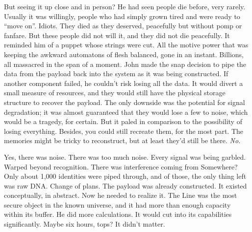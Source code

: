 But seeing it up close and in person? He had seen people die before, very rarely. Usually it was willingly, people who had simply grown tired and were ready to “move on”. Idiots. They died as they deserved, peacefully but without pomp or fanfare. But these people did not will it, and they did not die peacefully. It reminded him of a puppet whose strings were cut. All the motive power that was keeping the awkward automatons of flesh balanced, gone in an instant. Billions, all massacred in the span of a moment.
\SmallVSpace
John made the snap decision to pipe the data from the payload back into the system as it was being constructed. If another component failed, he couldn’t risk losing all the data. It would divert a small measure of resources, and they would still have the physical storage structure to recover the payload.  The only downside was the potential for signal degradation; it was almost guaranteed that they would lose a few to noise, which would be a tragedy, for certain. But it paled in comparison to the possibility of losing everything. Besides, you could still recreate them, for the most part. The memories might be tricky to reconstruct, but at least they’d still be there.
\SmallVSpace
\emph{No.}\par
\SmallVSpace
Yes, there was noise. There was too much noise. Every signal was being garbled. Warped beyond recognition. There was interference coming from{\el} Somewhere? Only about 1,000 identities were piped through, and of those, the only thing left was raw DNA.  Change of plans.
\SomeVSpace
The payload was already constructed. It existed conceptually, in abstract. Now he needed to realize it. The Line was the most secure object in the known universe, and it had more than enough capacity within its buffer. He did more calculations. It would cut into its capabilities significantly. Maybe six hours, tops? It didn’t matter.

